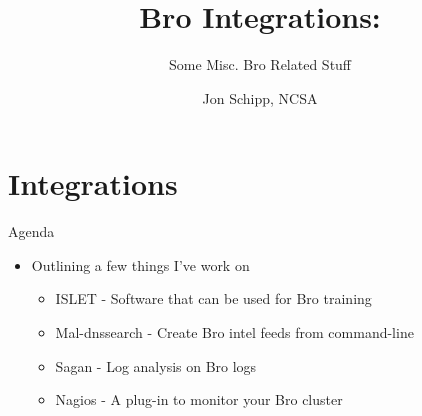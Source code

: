 \documentclass[xcolor=svgnames,handout]{beamer}
\title{Bro Integrations:}
\subtitle{Some Misc. Bro Related Stuff}
\author{Jon Schipp, \small NCSA}
\institute{%
BroCon15 \\
MIT, Cambridge, Massachusetts
}
\date[]{}
\begin{document}
\begin{frame}[plain]
  \titlepage
\end{frame}

\section{Integrations}

\begin{frame}[fragile]{}
  \begin{block}{Agenda}
    \begin{itemize}
      \item Outlining a few things I've work on
    	\begin{itemize}
      		\item ISLET - Software that can be used for Bro training
      		\item Mal-dnssearch - Create Bro intel feeds from command-line
      		\item Sagan - Log analysis on Bro logs
      		\item Nagios - A plug-in to monitor your Bro cluster
    	\end{itemize}
    \end{itemize}
  \end{block}
\end{frame}
\end{document}
